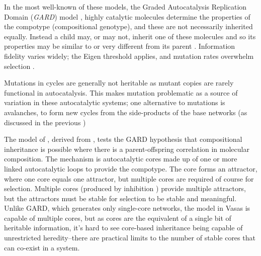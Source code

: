 
In the most well-known of these models, the Graded Autocatalysis Replication Domain (\emph{GARD}) model \parencite{Segre1998}, highly catalytic molecules determine the properties of the compotype (compositional genotype), and these are not necessarily inherited equally. Instead a child may, or may not, inherit one of these molecules and so its properties may be similar to or very different from its parent \parencite{Vasas2015, Vasas2012, Vasas2012a}. Information fidelity varies widely; the Eigen threshold \parencite{Eigen1971} applies, and mutation rates overwhelm selection \parencite{Vasas2015, Vasas2012, Vasas2012a}.

Mutations in cycles \parencite{Vasas2012a} are generally not heritable as mutant copies are rarely functional in autocatalysis. This makes mutation problematic as a source of variation in these autocatalytic systems; one alternative to mutations is avalanches, to form new cycles from the side-products of the base networks (as discussed in the previous )


The model of \cite{Vasas2015, Vasas2012, Vasas2012a}, derived from \cite{Farmer1986}, tests the GARD hypothesis that compositional inheritance is possible where there is a parent-offspring correlation in molecular composition. The mechanism is autocatalytic cores made up of one or more linked autocatalytic loops to provide the compotype. The core forms an attractor, where one core equals one attractor, but multiple cores are required of course for selection. Multiple cores (produced by inhibition \textcite{Vasas2012a}) provide multiple attractors, but the attractors must be stable for selection to be stable and meaningful. Unlike GARD, which generates only single-core networks, the model in Vasas is capable of multiple cores, but as cores are the equivalent of a single bit of heritable information, it's hard to see core-based inheritance being capable of unrestricted heredity--there are practical limits to the number of stable cores that can co-exist in a system. 

